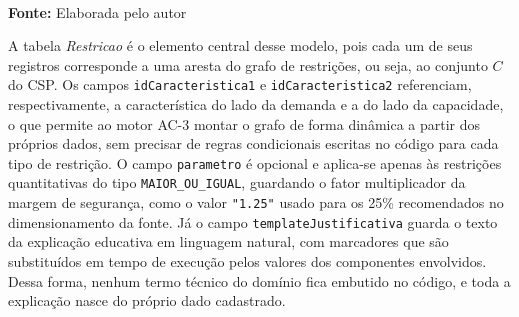 \FloatBarrier
\begin{table}[!htbp]
  \centering
  \caption{Restricao}
  \\ \vspace{0.2cm}
  \textbf{Fonte:} Elaborada pelo autor
  \label{tab:tabelaRestricao}
\end{table}
\FloatBarrier

A tabela \textit{Restricao} é o elemento central desse modelo, pois cada um de seus registros corresponde a uma aresta do grafo de restrições, ou seja, ao conjunto $C$ do CSP. Os campos \texttt{idCaracteristica1} e \texttt{idCaracteristica2} referenciam, respectivamente, a característica do lado da demanda e a do lado da capacidade, o que permite ao motor AC-3 montar o grafo de forma dinâmica a partir dos próprios dados, sem precisar de regras condicionais escritas no código para cada tipo de restrição. O campo \texttt{parametro} é opcional e aplica-se apenas às restrições quantitativas do tipo \texttt{MAIOR\_OU\_IGUAL}, guardando o fator multiplicador da margem de segurança, como o valor \texttt{"1.25"} usado para os 25\% recomendados no dimensionamento da fonte. Já o campo \texttt{templateJustificativa} guarda o texto da explicação educativa em linguagem natural, com marcadores que são substituídos em tempo de execução pelos valores dos componentes envolvidos. Dessa forma, nenhum termo técnico do domínio fica embutido no código, e toda a explicação nasce do próprio dado cadastrado.

